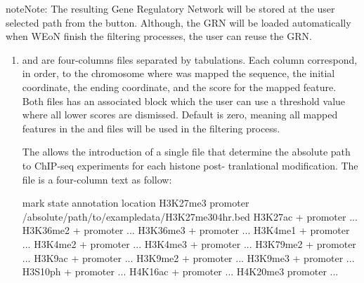 \documentclass[letterpaper,10pt,english]{sphinxmanual}
\begin{document}
\begin{sphinxadmonition}{note}{Note:}
The resulting Gene Regulatory Network will be stored at the user selected path
from the  button. Although, the GRN will be loaded automatically
when WEoN finish the filtering processes, the user can reuse the GRN.
\end{sphinxadmonition}
\begin{enumerate}
\def\theenumi{\arabic{enumi}}
\def\labelenumi{\theenumi .}
\makeatletter\def\p@enumii{\p@enumi \theenumi .}\makeatother
\setcounter{enumi}{2}
\item {} 

 and  are four-columns files separated by
tabulations. Each column correspond, in order, to the chromosome where was mapped
the sequence, the initial coordinate, the ending coordinate, and the score for
the mapped feature. Both files has an associated  block which the user
can use a threshold value where all lower scores are dismissed. Default is zero,
meaning all mapped features in the  and  files will
be used in the filtering process.

The  allows the introduction of a single file that
determine the absolute path to ChIP-seq experiments for each histone post-
tranlational modification. The file is a four-column text as follow:

\begin{sphinxVerbatim}[commandchars=\\\{\}]
mark            state   annotation      location
H3K27me3        \PYGZhy{}               promoter        /absolute/path/to/example\PYGZus{}data/H3K27me3\PYGZus{}0\PYGZhy{}4hr.bed
H3K27ac         +               promoter        ...
H3K36me2        +               promoter        ...
H3K36me3        +               promoter        ...
H3K4me1         +               promoter        ...
H3K4me2         +               promoter        ...
H3K4me3         +               promoter        ...
H3K79me2        +               promoter        ...
H3K9ac          +               promoter        ...
H3K9me2         +               promoter        ...
H3K9me3         +               promoter        ...
H3S10ph         +               promoter        ...
H4K16ac         +               promoter        ...
H4K20me3        \PYGZhy{}               promoter        ...
\end{sphinxVerbatim}

\end{enumerate}
\end{document}
